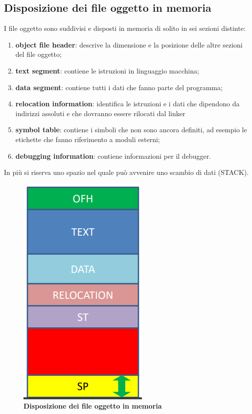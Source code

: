 \documentclass[12pt]{article} %
\begin{document}
\subsection{Disposizione dei file oggetto in memoria}
I file oggetto sono suddivisi e disposti in memoria di solito in sei sezioni distinte:
\begin{enumerate}
    \item \textbf{object file header}: descrive la dimensione e la posizione delle altre sezioni del file oggetto;
    \item \textbf{text segment}: contiene le istruzioni in linguaggio macchina;
    \item \textbf{data segment}: contiene tutti i dati che fanno parte del programma;
    \item  \textbf{relocation information}: identifica le istruzioni e i dati che dipendono da indirizzi assoluti e che dovranno essere rilocati dal linker
    \item \textbf{symbol table}: contiene i simboli che non sono ancora definiti, ad esempio le etichette che fanno riferimento a moduli esterni;
    \item \textbf{debugging information}: contiene informazioni per il debugger.
\end{enumerate}
In più si riserva uno spazio nel quale può avvenire uno scambio di dati (STACK).\par\medskip\noindent 
\begin{figure}[h]
    \centering
    \includegraphics[width=0.30\linewidth]{disposizione file oggetto.png}
    \caption{\textbf{Disposizione dei file oggetto in memoria}}
    \label{fig:enter-label}
\end{figure}
\newpage
\end{document}
